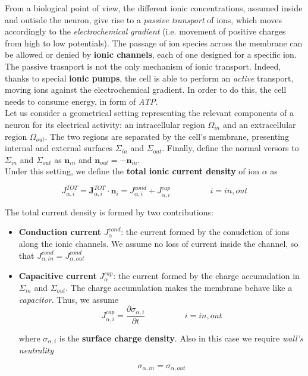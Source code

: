 \documentclass[a4paper]{article}
\begin{document}
From a biological point of view, the different ionic concentrations, assumed inside and outisde the neuron, give rise to a \textit{passive transport} of ions, which moves accordingly to the \textit{electrochemical gradient} (i.e. movement of positive charges from high to low potentials). The passage of ion species across the membrane can be allowed or denied by \textbf{ionic channels}, each of one designed  for a specific ion. The passive trasnport is not the only mechanism of ionic transport. Indeed, thanks to special \textbf{ionic pumps}, the cell is able to perform an \textit{active} transport, moving ions against the electrochemical gradient. In order to do this, the cell needs to consume energy, in form of \textit{ATP}.\\
Let us consider a geometrical setting representing the relevant components of a neuron for its electrical activity: an intracellular region $ \Omega_{in}$ and an extracellular region $\Omega_{out}$. The two regions are separated by the cell's membrane, presenting internal and external surfaces $\Sigma_{in}$ and $\Sigma_{out}$. Finally, define the normal versors to  $\Sigma_{in}$ and $\Sigma_{out}$ as  $\textbf{n}_{in}$  and  $\textbf{n}_{out} = - \textbf{n}_{in}$.\\

Under this setting, we define the \textbf{total ionic current density} of ion $\alpha$ as

\begin{equation}
J_{\alpha,i}^{TOT} =	\textbf{J}_{\alpha,i}^{TOT} \cdot \textbf{n}_{i} = J^{cond}_{\alpha,i} + J^{cap}_{\alpha,i} \hspace{2cm} i= in,out
\end{equation}
	
	
The total current density is formed by two contributions:

\begin{itemize}
	
	\item \textbf{Conduction current} $J^{cond}_{\alpha}$: the current formed by the conudction of ions along the ionic channels. We assume no loss of current inside the channel, so that $J^{cond}_{\alpha, in} = J^{cond}_{\alpha, out}$
	
	\item \textbf{Capacitive current} $J^{cap}_{\alpha}$: the current formed by the charge accumulation in $\Sigma_{in}$ and $\Sigma_{out}$. The charge accumulation makes the membrane behave like a \textit{capacitor}. Thus, we assume 
	\begin{equation}
		J^{cap}_{\alpha,i} = \frac{\partial \sigma_{\alpha,i}}{\partial t}  \hspace{2cm} i= in,out
	\end{equation}
	
	where $\sigma_{\alpha,i}$ is the \textbf{surface charge density}. Also in this case we require \textit{wall's neutrality}
	
	\begin{equation}
\sigma_{\alpha,in} = \sigma_{\alpha,out}
	\end{equation}
\end{itemize}	
	
\end{document}
